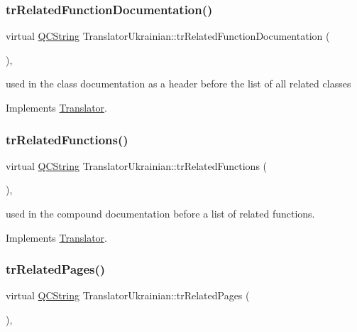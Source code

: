 \subsubsection{\texorpdfstring{trRelatedFunctionDocumentation()}{trRelatedFunctionDocumentation()}}
{\footnotesize\ttfamily virtual \mbox{\hyperlink{class_q_c_string}{Q\+C\+String}} Translator\+Ukrainian\+::tr\+Related\+Function\+Documentation (\begin{DoxyParamCaption}{ }\end{DoxyParamCaption})\hspace{0.3cm}{\ttfamily [inline]}, {\ttfamily [virtual]}}

used in the class documentation as a header before the list of all related classes 

Implements \mbox{\hyperlink{class_translator}{Translator}}.

\mbox{\label{class_translator_ukrainian_a1ca62fb4e87031aa33dd1823552dcd90}} 
\subsubsection{\texorpdfstring{trRelatedFunctions()}{trRelatedFunctions()}}
{\footnotesize\ttfamily virtual \mbox{\hyperlink{class_q_c_string}{Q\+C\+String}} Translator\+Ukrainian\+::tr\+Related\+Functions (\begin{DoxyParamCaption}{ }\end{DoxyParamCaption})\hspace{0.3cm}{\ttfamily [inline]}, {\ttfamily [virtual]}}

used in the compound documentation before a list of related functions. 

Implements \mbox{\hyperlink{class_translator}{Translator}}.

\mbox{\label{class_translator_ukrainian_a84bc58ab96d784724ea738381ee8fb94}} 
\subsubsection{\texorpdfstring{trRelatedPages()}{trRelatedPages()}}
{\footnotesize\ttfamily virtual \mbox{\hyperlink{class_q_c_string}{Q\+C\+String}} Translator\+Ukrainian\+::tr\+Related\+Pages (\begin{DoxyParamCaption}{ }\end{DoxyParamCaption})\hspace{0.3cm}{\ttfamily [inline]}, {\ttfamily [virtual]}}

